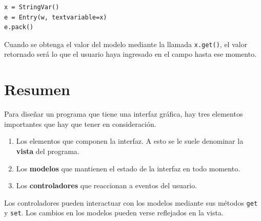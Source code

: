 \begin{lstlisting}
x = StringVar()
e = Entry(w, textvariable=x)
e.pack()
\end{lstlisting}

Cuando se obtenga el valor del modelo mediante la llamada
\lstinline!x.get()!, el valor retornado será lo que el usuario haya
ingresado en el campo hasta ese momento.

\section{Resumen}

Para diseñar un programa que tiene una interfaz gráfica, hay tres
elementos importantes que hay que tener en consideración.

\begin{enumerate}
\item
  Los elementos que componen la interfaz. A esto se le suele denominar
  la \textbf{vista} del programa.
\item
  Los \textbf{modelos} que mantienen el estado de la interfaz en todo
  momento.
\item
  Los \textbf{controladores} que reaccionan a eventos del usuario.
\end{enumerate}

Los controladores pueden interactuar con los modelos mediante sus
métodos \lstinline!get! y \lstinline!set!. Los cambios en los modelos
pueden verse reflejados en la vista.
